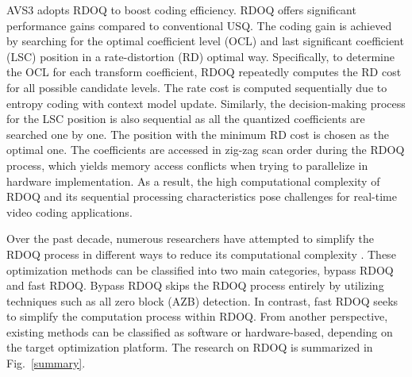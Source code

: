 \documentclass[lettersize,journal]{IEEEtran}
\begin{document}

AVS3 adopts RDOQ to boost coding efficiency. RDOQ offers significant performance gains compared to conventional USQ. The coding gain is achieved by searching for the optimal coefficient level (OCL) and last significant coefficient (LSC) position in a rate-distortion (RD) optimal way. Specifically, to determine the OCL for each transform coefficient, RDOQ repeatedly computes the RD cost for all possible candidate levels. The rate cost is computed sequentially due to entropy coding with context model update. Similarly, the decision-making process for the LSC position is also sequential as all the quantized coefficients are searched one by one. The position with the minimum RD cost is chosen as the optimal one. The coefficients are accessed in zig-zag scan order during the RDOQ process, which yields memory access conflicts when trying to parallelize in hardware implementation. As a result, the high computational complexity of RDOQ and its sequential processing characteristics pose challenges for real-time video coding applications. 

Over the past decade, numerous researchers have attempted to simplify the RDOQ process in different ways to reduce its computational complexity \cite{yin2014fasttrellis, wang2017fast, yin2019efficient, wang2021trellis}. These optimization methods can be classified into two main categories, bypass RDOQ and fast RDOQ. Bypass RDOQ skips the RDOQ process entirely by utilizing techniques such as all zero block (AZB) detection. In contrast, fast RDOQ seeks to simplify the computation process within RDOQ. From another perspective, existing methods can be classified as software or hardware-based, depending on the target optimization platform. The research on RDOQ is summarized in Fig.~\ref{summary}. 
\end{document}

